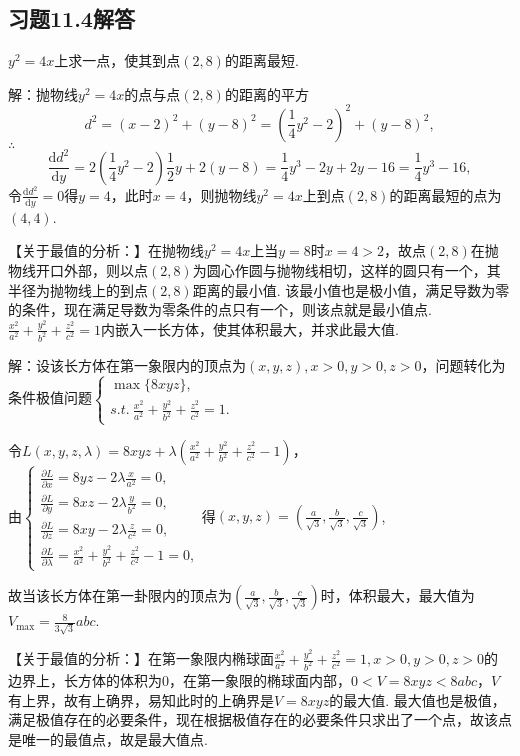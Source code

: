 \documentclass[12pt,UTF8]{ctexart}
\begin{document}
\subsection{习题11.4解答}
\begin{enumerate}
$y^2=4x$上求一点，使其到点$(2,8)$的距离最短.

解：抛物线$y^2=4x$的点与点$(2,8)$的距离的平方
\[d^2=(x-2)^2+(y-8)^2=(\frac14y^2-2)^2+(y-8)^2,\]
$\therefore$
\[\frac{\mathrm dd^2}{\mathrm dy}=2(\frac14y^2-2)\frac12y+2(y-8)=\frac14y^3-2y+2y-16=\frac14y^3-16,\]
令$\frac{\mathrm dd^2}{\mathrm dy}=0$得$y=4$，此时$x=4$，则抛物线$y^2=4x$上到点$(2,8)$的距离最短的点为$(4,4)$.

【关于最值的分析：】在抛物线$y^2=4x$上当$y=8$时$x=4>2$，故点$(2,8)$在抛物线开口外部，则以点$(2,8)$为圆心作圆与抛物线相切，这样的圆只有一个，其半径为抛物线上的到点$(2,8)$距离的最小值. 该最小值也是极小值，满足导数为零的条件，现在满足导数为零条件的点只有一个，则该点就是最小值点.
$\frac{x^2}{a^2}+\frac{y^2}{b^2}+\frac{z^2}{c^2}=1$内嵌入一长方体，使其体积最大，并求此最大值.

解：设该长方体在第一象限内的顶点为$(x,y,z),x>0,y>0,z>0$，问题转化为条件极值问题$\begin{cases}
\max\{8xyz\},\\
s.t.\ \frac{x^2}{a^2}+\frac{y^2}{b^2}+\frac{z^2}{c^2}=1.
\end{cases}$

令$L(x,y,z,\lambda)=8xyz+\lambda(\frac{x^2}{a^2}+\frac{y^2}{b^2}+\frac{z^2}{c^2}-1)$，\\
由$\begin{cases}
\frac{\partial L}{\partial x}=8yz-2\lambda\frac x{a^2}=0,\\
\frac{\partial L}{\partial y}=8xz-2\lambda\frac y{b^2}=0,\\
\frac{\partial L}{\partial z}=8xy-2\lambda\frac z{c^2}=0,\\
\frac{\partial L}{\partial\lambda}=\frac{x^2}{a^2}+\frac{y^2}{b^2}+\frac{z^2}{c^2}-1=0,
\end{cases}$得$(x,y,z)=(\frac a{\sqrt3},\frac b{\sqrt3},\frac c{\sqrt3})$,

故当该长方体在第一卦限内的顶点为$(\frac a{\sqrt3},\frac b{\sqrt3},\frac c{\sqrt3})$时，体积最大，最大值为$V_{\max}=\frac8{3\sqrt3}abc$.

【关于最值的分析：】在第一象限内椭球面$\frac{x^2}{a^2}+\frac{y^2}{b^2}+\frac{z^2}{c^2}=1,x>0,y>0,z>0$的边界上，长方体的体积为$0$，在第一象限的椭球面内部，$0<V=8xyz<8abc$，$V$有上界，故有上确界，易知此时的上确界是$V=8xyz$的最大值. 最大值也是极值，满足极值存在的必要条件，现在根据极值存在的必要条件只求出了一个点，故该点是唯一的最值点，故是最大值点. 


\end{enumerate}
\end{document}
